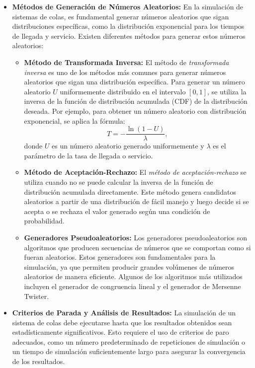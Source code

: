 \documentclass{article}
\begin{document}
\begin{itemize}
    \item \textbf{Métodos de Generación de Números Aleatorios:}  
    En la simulación de sistemas de colas, es fundamental generar números aleatorios que sigan distribuciones específicas, como la distribución exponencial para los tiempos de llegada y servicio. Existen diferentes métodos para generar estos números aleatorios:
    
    \begin{itemize}
        \item \textbf{Método de Transformada Inversa:}  
        El método de \textit{transformada inversa} es uno de los métodos más comunes para generar números aleatorios que sigan una distribución específica. Para generar un número aleatorio \( U \) uniformemente distribuido en el intervalo \([0, 1]\), se utiliza la inversa de la función de distribución acumulada (CDF) de la distribución deseada. Por ejemplo, para obtener un número aleatorio con distribución exponencial, se aplica la fórmula:
        \[
        T = -\frac{\ln(1-U)}{\lambda},
        \]
        donde \( U \) es un número aleatorio generado uniformemente y \( \lambda \) es el parámetro de la tasa de llegada o servicio.

        \item \textbf{Método de Aceptación-Rechazo:}  
        El \textit{método de aceptación-rechazo} se utiliza cuando no se puede calcular la inversa de la función de distribución acumulada directamente. Este método genera candidatos aleatorios a partir de una distribución de fácil manejo y luego decide si se acepta o se rechaza el valor generado según una condición de probabilidad.

        \item \textbf{Generadores Pseudoaleatorios:}  
        Los generadores pseudoaleatorios son algoritmos que producen secuencias de números que se comportan como si fueran aleatorios. Estos generadores son fundamentales para la simulación, ya que permiten producir grandes volúmenes de números aleatorios de manera eficiente. Algunos de los algoritmos más utilizados incluyen el generador de congruencia lineal y el generador de Mersenne Twister.
    \end{itemize}
    
    \item \textbf{Criterios de Parada y Análisis de Resultados:}  
    La simulación de un sistema de colas debe ejecutarse hasta que los resultados obtenidos sean estadísticamente significativos. Esto requiere el uso de criterios de paro adecuados, como un número predeterminado de repeticiones de simulación o un tiempo de simulación suficientemente largo para asegurar la convergencia de los resultados.


\end{itemize}
\end{document}
